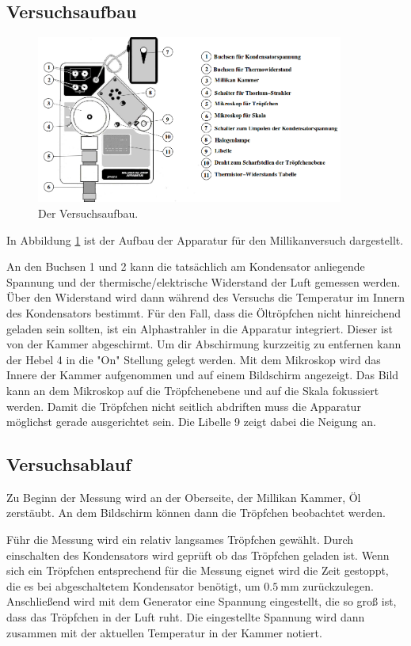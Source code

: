 \documentclass[
  bibliography=totoc,     %
  captions=tableheading,  %
  titlepage=firstiscover, %
]{scrartcl}
\begin{document}
\subsection{Versuchsaufbau}
\begin{figure}[htb]
  \centering
  \includegraphics[width=0.9\textwidth]{5031.png}
  \caption{Der Versuchsaufbau. \cite{anleitung}}
  \label{fig:5031}
\end{figure}
In Abbildung \ref{fig:5031} ist der Aufbau der Apparatur für den Millikanversuch
dargestellt.

\noindent
An den Buchsen 1 und 2 kann die tatsächlich am Kondensator anliegende Spannung
und der thermische/elektrische Widerstand der Luft gemessen werden.
Über den Widerstand wird dann während des Versuchs die Temperatur im Innern des
Kondensators bestimmt. Für den Fall, dass die Öltröpfchen nicht hinreichend geladen sein sollten,
ist ein Alphastrahler in die Apparatur integriert. Dieser ist von der Kammer abgeschirmt.
Um dir Abschirmung kurzzeitig zu entfernen kann der Hebel 4 in die "On" Stellung
gelegt werden. Mit dem Mikroskop wird das Innere der Kammer aufgenommen und auf
einem Bildschirm angezeigt. Das Bild kann an dem Mikroskop auf die Tröpfchenebene
und auf die Skala fokussiert werden. Damit die Tröpfchen nicht seitlich abdriften
muss die Apparatur möglichst gerade ausgerichtet sein. Die Libelle 9 zeigt dabei
die Neigung an.
\subsection{Versuchsablauf}
Zu Beginn der Messung wird an der Oberseite, der Millikan Kammer, Öl zerstäubt.
An dem Bildschirm können dann die Tröpfchen beobachtet werden.

\noindent
Führ die Messung wird ein relativ langsames Tröpfchen gewählt.
Durch einschalten des Kondensators wird geprüft ob das Tröpfchen
geladen ist. Wenn sich ein Tröpfchen entsprechend für die Messung
eignet wird die Zeit gestoppt, die es bei abgeschaltetem Kondensator
benötigt, um $\SI{0.5}{\milli\meter}$ zurückzulegen. Anschließend wird
mit dem Generator eine Spannung eingestellt, die so groß ist, dass das
Tröpfchen in der Luft ruht. Die eingestellte Spannung wird dann zusammen
mit der aktuellen Temperatur in der Kammer notiert.
\end{document}
